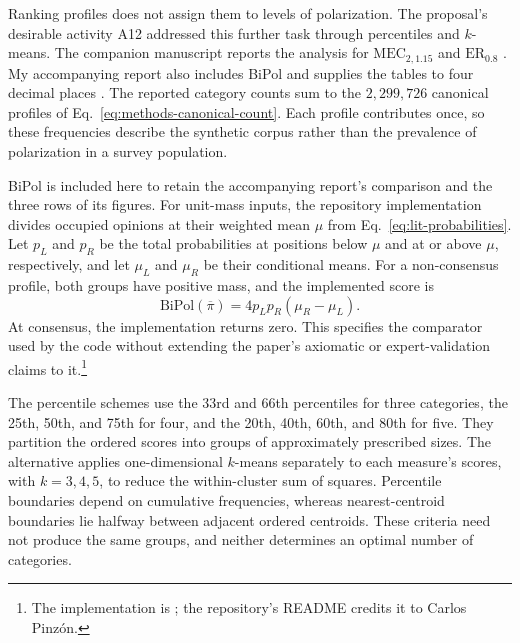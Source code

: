 \documentclass{article}
\theoremstyle{plain}
\theoremstyle{remark}
\begin{document}
Ranking profiles does not assign them to levels of polarization. The proposal's desirable activity A12 addressed this further task through percentiles and $k$-means. The companion manuscript reports the analysis for $\mathrm{MEC}_{2,1.15}$ and $\mathrm{ER}_{0.8}$ \citep[Section~9.4, pp.~29--32]{arandaMECthresholds}. My accompanying report also includes BiPol and supplies the tables to four decimal places \citep[``Threshold Analysis for Polarization Classification'']{narvaez2025thresholds}. The reported category counts sum to the $2{,}299{,}726$ canonical profiles of Eq.~\eqref{eq:methods-canonical-count}. Each profile contributes once, so these frequencies describe the synthetic corpus rather than the prevalence of polarization in a survey population.

BiPol is included here to retain the accompanying report's comparison and the three rows of its figures. For unit-mass inputs, the repository implementation divides occupied opinions at their weighted mean $\mu$ from Eq.~\eqref{eq:lit-probabilities}. Let $p_L$ and $p_R$ be the total probabilities at positions below $\mu$ and at or above $\mu$, respectively, and let $\mu_L$ and $\mu_R$ be their conditional means. For a non-consensus profile, both groups have positive mass, and the implemented score is
\begin{equation}\label{eq:methods-bipol}
\mathrm{BiPol}(\overline\pi)=4p_Lp_R(\mu_R-\mu_L).
\end{equation}
At consensus, the implementation returns zero. This specifies the comparator used by the code without extending the paper's axiomatic or expert-validation claims to it.\footnote{The implementation is ; the repository's README credits it to Carlos Pinzón.}

The percentile schemes use the 33rd and 66th percentiles for three categories, the 25th, 50th, and 75th for four, and the 20th, 40th, 60th, and 80th for five. They partition the ordered scores into groups of approximately prescribed sizes. The alternative applies one-dimensional $k$-means separately to each measure's scores, with $k=3,4,5$, to reduce the within-cluster sum of squares. Percentile boundaries depend on cumulative frequencies, whereas nearest-centroid boundaries lie halfway between adjacent ordered centroids. These criteria need not produce the same groups, and neither determines an optimal number of categories.
\end{document}
